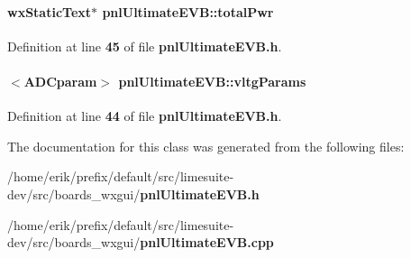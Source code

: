 \paragraph[{total\+Pwr}]{\setlength{\rightskip}{0pt plus 5cm}wx\+Static\+Text$\ast$ pnl\+Ultimate\+E\+V\+B\+::total\+Pwr\hspace{0.3cm}{\ttfamily [protected]}}\label{classpnlUltimateEVB_ab93b06b8bce8dd3b32b1aee8dbf48931}


Definition at line {\bf 45} of file {\bf pnl\+Ultimate\+E\+V\+B.\+h}.

\paragraph[{vltg\+Params}]{$<${\bf A\+D\+Cparam}$>$ pnl\+Ultimate\+E\+V\+B\+::vltg\+Params\hspace{0.3cm}{\ttfamily [protected]}}\label{classpnlUltimateEVB_af21dfc7a3fc333f3df8f718e5769eeb5}


Definition at line {\bf 44} of file {\bf pnl\+Ultimate\+E\+V\+B.\+h}.



The documentation for this class was generated from the following files\+:\begin{DoxyCompactItemize}
\item 
/home/erik/prefix/default/src/limesuite-\/dev/src/boards\+\_\+wxgui/{\bf pnl\+Ultimate\+E\+V\+B.\+h}\item 
/home/erik/prefix/default/src/limesuite-\/dev/src/boards\+\_\+wxgui/{\bf pnl\+Ultimate\+E\+V\+B.\+cpp}\end{DoxyCompactItemize}
